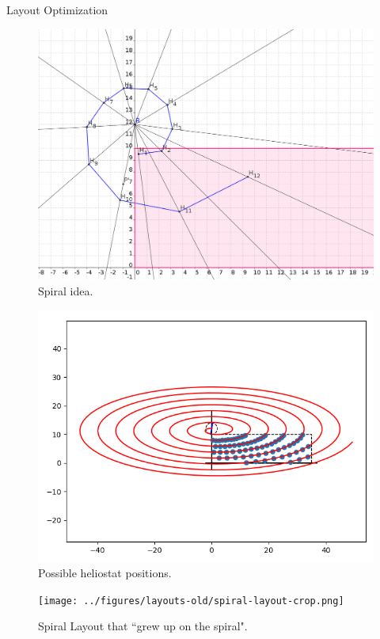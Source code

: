 \documentclass[10pt, xcolor={dvipsnames}]{beamer}
\begin{document}
\begin{frame}{Layout Optimization}
\begin{minipage}[t]{0.5\textwidth}
\begin{center}
\begin{figure}
\includegraphics[width=\textwidth]{../figures/spiral/spiral-construction.png}
\caption{Spiral idea.}
\end{figure}
\end{center}
\end{minipage}%
\begin{minipage}[t]{0.5\textwidth}
\begin{center}
\vspace{-.5cm}
\begin{figure}
\includegraphics[width=\textwidth]{../figures/spiral/spiral_plot.png}
\caption{Possible heliostat positions.}
\end{figure}
\end{center}
\end{minipage}
\begin{center}
\begin{figure}
\texttt{[image: ../figures/layouts-old/spiral-layout-crop.png]}
\caption{Spiral Layout that ``grew up on the spiral".}
\end{figure}
\end{center}
\end{frame}
\end{document}
